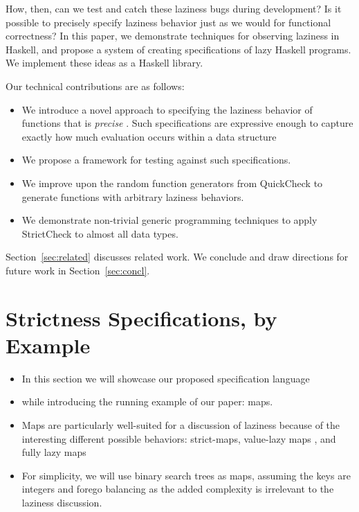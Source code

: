 \documentclass[acmsmall,review]{acmart}\settopmatter{}
\begin{document}
How, then, can we test and catch these laziness bugs during development? Is it
possible to precisely specify laziness behavior just as we would for functional
correctness?
%
In this paper, we demonstrate techniques for observing laziness in Haskell, and
propose a system of creating specifications of lazy Haskell programs. We
implement these ideas as a Haskell library.

Our technical contributions are as follows:
\begin{itemize}
\item We introduce a novel approach to specifying the laziness behavior of functions that is
{\em precise} . Such specifications are
expressive enough to capture exactly how much evaluation occurs within
a data structure  
\item We propose a framework for testing against such specifications.
\item We improve upon the random function generators from QuickCheck to generate functions with arbitrary laziness behaviors.
\item We demonstrate non-trivial generic programming techniques to apply StrictCheck to almost all data types.
\end{itemize}
%
Section~\ref{sec:related} discusses related work. We conclude and draw
directions for future work in Section~\ref{sec:concl}.

\section{Strictness Specifications, by Example}
\label{sec:quickchick}


\begin{itemize}
\item In this section we will showcase our proposed specification language 
\item while introducing the running example of our paper: maps.
\item Maps are particularly well-suited for a discussion of laziness because of the interesting different
possible behaviors: strict-maps, value-lazy maps , and fully lazy maps
\item For simplicity, we will use binary search trees as maps, assuming the keys are integers and forego balancing
as the added complexity is irrelevant to the laziness discussion. 
\end{itemize}
\end{document}
